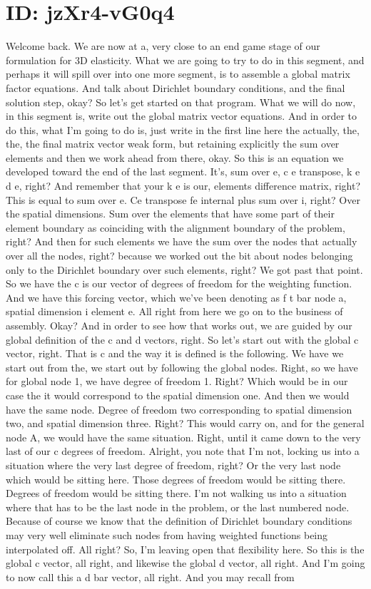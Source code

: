 \documentclass[10pt]{article}
\begin{document}
\section*{ID: jzXr4-vG0q4}
Welcome back. We are now at a, very close to an end game stage of our formulation for 3D elasticity. What we are going to try to do in this segment, and perhaps it will spill over into one more segment, is to assemble a global matrix factor equations. And talk about Dirichlet boundary conditions, and the final solution step, okay? So let's get started on that program. What we will do now, in this segment is, write out the global matrix vector equations. And in order to do this, what I'm going to do is, just write in the first line here the actually, the, the, the final matrix vector weak form, but retaining explicitly the sum over elements and then we work ahead from there, okay. So this is an equation we developed toward the end of the last segment. It's, sum over e, c e transpose, k e d e, right? And remember that your k e is our, elements difference matrix, right? This is equal to sum over e. Ce transpose fe internal plus sum over i, right? Over the spatial dimensions. Sum over the elements that have some part of their element boundary as coinciding with the alignment boundary of the problem, right? And then for such elements we have the sum over the nodes that actually over all the nodes, right? because we worked out the bit about nodes belonging only to the Dirichlet boundary over such elements, right? We got past that point. So we have the c is our vector of degrees of freedom for the weighting function. And we have this forcing vector, which we've been denoting as f t bar node a, spatial dimension i element e. All right from here we go on to the business of assembly. Okay? And in order to see how that works out, we are guided by our global definition of the c and d vectors, right. So let's start out with the global c vector, right. That is c and the way it is defined is the following. We have we start out from the, we start out by following the global nodes. Right, so we have for global node 1, we have degree of freedom 1. Right? Which would be in our case the it would correspond to the spatial dimension one. And then we would have the same node. Degree of freedom two corresponding to spatial dimension two, and spatial dimension three. Right? This would carry on, and for the general node A, we would have the same situation. Right, until it came down to the very last of our c degrees of freedom. Alright, you note that I'm not, locking us into a situation where the very last degree of freedom, right? Or the very last node which would be sitting here. Those degrees of freedom would be sitting there. Degrees of freedom would be sitting there. I'm not walking us into a situation where that has to be the last node in the problem, or the last numbered node. Because of course we know that the definition of Dirichlet boundary conditions may very well eliminate such nodes from having weighted functions being interpolated off. All right? So, I'm leaving open that flexibility here. So this is the global c vector, all right, and likewise the global d vector, all right. And I'm going to now call this a d bar vector, all right. And you may recall from 
\end{document}
